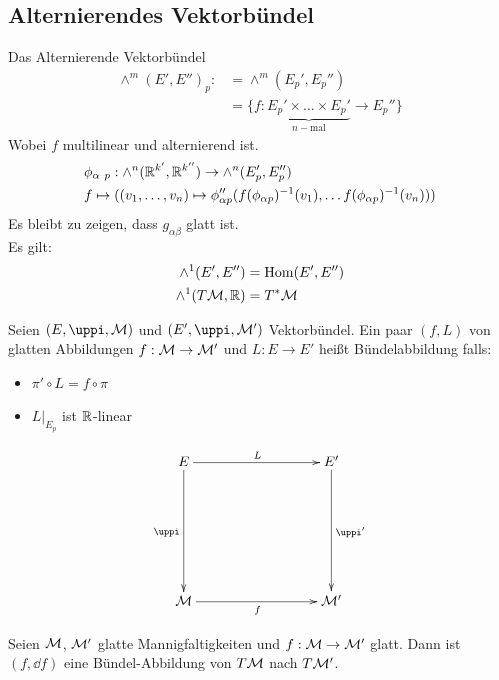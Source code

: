 \subsection{Alternierendes Vektorbündel}
Das Alternierende Vektorbündel
\begin{align}
\wedge^m(E', E'')_p :&= \wedge^m(E_{p}', E_{p}'')\\
&= \{ f: \underbrace{E_{p}' \times \dots \times E_{p}'}_{n-\mathrm{mal}} \to E_{p}'' \}
\end{align}
Wobei $f$ multilinear und alternierend ist. 
\begin{align}
&\phi_{\alpha \ p}: \wedge^n (\mathbb{R}^{k'}, \mathbb{R}^{k''}) \to \wedge^n (E_{p}', E_{p}'')\\
&f \mapsto ((v_1, \dots, v_n) \mapsto \phi_{\alpha p}''( f(\phi_{\alpha p})^{-1} (v_1), \dots f(\phi_{\alpha p})^{-1} (v_n)) )
\end{align}
Es bleibt zu zeigen, dass $g_{\alpha \beta}$ glatt ist.\\
Es gilt: 
\begin{align}
\wedge^1 (E', E'') &= \mathrm{Hom}(E', E'')\\
\wedge^1 (T\mathcal{M}, \mathbb{R}) &= T^{*}\mathcal{M}
\end{align}

\begin{defs}
Seien $(E, \pi, \mfk)$ und $(E', \pi, \mfk')$ Vektorbündel.
Ein paar $(f, L)$ von glatten Abbildungen $f: \mathcal{M} \to \mathcal{M}'$ und $L: E \to E'$ heißt Bündelabbildung falls:
\begin{itemize}
\item $\pi' \circ L = f \circ \pi$
\item $L\big\vert_{E_p}$ ist $\mathbb{R}$-linear
\end{itemize}


\begin{align}
\begin{xy}
  \xymatrix@=0.25\linewidth{
      E \ar[r]^L \ar[d]_\pi    &   E' \ar[d]^{\pi '}  \\
      \mfk \ar[r]_f             &   \mfk'   
  }
\end{xy}
\end{align}
\end{defs}

\begin{bsp}
Seien $\mathcal{M}$, $\mathcal{M}'$ glatte Mannigfaltigkeiten und $f:\mathcal{M} \to \mathcal{M}'$ glatt.
Dann ist $(f, \dd f)$ eine Bündel-Abbildung von $T\mathcal{M}$ nach $T\mathcal{M}'$.
\end{bsp}

